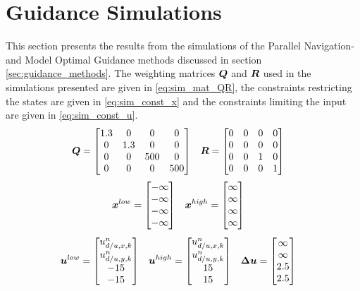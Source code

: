 \section{Guidance Simulations} %
\label{sec:guidance_simulations}
This section presents the results from the simulations of the Parallel Navigation- and Model Optimal Guidance methods discussed in section \ref{sec:guidance_methods}. The weighting matrices $\boldsymbol{Q}$ and $\boldsymbol{R}$ used in the simulations presented are given in \ref{eq:sim_mat_QR}, the constraints restricting the states are given in \ref{eq:sim_const_x} and the constraints limiting the input are given in \ref{eq:sim_const_u}.
\begin{align}\label{eq:sim_mat_QR}
	\boldsymbol{Q}&=
	\begin{bmatrix}
		1.3&0&0&0\\
		0&1.3&0&0\\
		0&0&500&0\\
		0&0&0&500
	\end{bmatrix}
	&
	\boldsymbol{R}&=
	\begin{bmatrix}
		0&0&0&0\\
		0&0&0&0\\
		0&0&1&0\\
		0&0&0&1
	\end{bmatrix}
\end{align}
\begin{align}\label{eq:sim_const_x}
	\boldsymbol{x}^{low}
	&=
	\begin{bmatrix}
		-\infty\\
		-\infty\\
		-\infty\\
		-\infty
	\end{bmatrix}
	&
	\boldsymbol{x}^{high}
	&=
	\begin{bmatrix}
		\infty\\
		\infty\\
		\infty\\
		\infty
	\end{bmatrix}
\end{align}
\begin{align}\label{eq:sim_const_u}
		\boldsymbol{u}^{low}
	&=
	\begin{bmatrix}
		u^n_{d/u,x,k}\\
		u^n_{d/u,y,k}\\
		-15\\
		-15
	\end{bmatrix}
	&
	\boldsymbol{u}^{high}
	&=
	\begin{bmatrix}
		u^n_{d/u,x,k}\\
		u^n_{d/u,y,k}\\
		15\\
		15
	\end{bmatrix}
	&
	\boldsymbol{\Delta u}
	&=
	\begin{bmatrix}
		\infty\\
		\infty\\
		2.5\\
		2.5
	\end{bmatrix}
\end{align}
